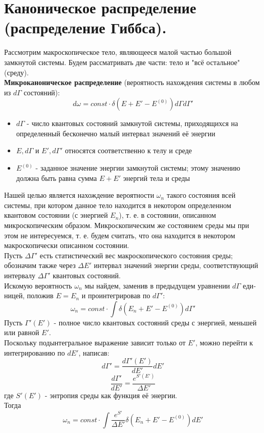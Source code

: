 \section {Каноническое распределение (распределение Гиббса).}
Рассмотрим макроскопическое тело, являющееся малой частью большой замкнутой системы. Будем рассматривать две части: тело и "всё остальное" (среду).\\
\textbf{Микроканоническое распределение} (вероятность нахождения системы в любом из $d\Gamma$ состояний):
$$
d\omega = const \cdot \delta (E + E' - E^{(0)})d\Gamma	d\Gamma'
$$
\begin{itemize}
	\item $d\Gamma$ - число квантовых состояний замкнутой системы, приходящихся на определенный бесконечно малый интервал значений её энергии
	\item $E, d\Gamma$ и $ E', d\Gamma'$ относятся соответственно к телу и среде
	\item $E^{(0)}$ - заданное значение энергии замкнутой системы; этому
	значению должна быть равна сумма $E + E'$ энергий тела и среды
\end{itemize}
Нашей целью является нахождение вероятности $\omega_n$ такого
состояния всей системы, при котором данное тело находится в
некотором определенном квантовом состоянии (с энергией $E_n$),
т. е. в состоянии, описанном микроскопическим образом. Ми­кроскопическим же состоянием среды мы при этом не инте­ресуемся, т. е. будем считать, что она находится в некотором макроскопически описанном состоянии.\\
Пусть $\Delta\Gamma'$ есть стати­стический вес макроскопического состояния среды; обозначим также через $\Delta E'$ интервал значений энергии среды, соответствующий интервалу $\Delta\Gamma'$ квантовых состояний.\\
Искомую вероятность $\omega_n$ мы найдем, заменив в предыдущем уравнении $d\Gamma$ еди­ницей, положив $E = E_n$ и проинтегрировав по $d\Gamma'$:
$$
\omega_n = const \cdot \int \delta(E_n + E' - E^{(0)})d\Gamma'
$$
Пусть $\Gamma'(E')$ - полное число квантовых состояний среды с энергией, меньшей или равной $E'$.\\
Поскольку подынтегральное выражение зависит только от $E'$, можно перейти к интегри­рованию по $dE'$, написав:
$$
d\Gamma' = \frac{d\Gamma'(E')}{dE'}dE'
$$
$$
\frac{d\Gamma'}{dE'} = \frac{e^{S'(E')}}{\Delta E'}
$$
где $S'(E')$ - энтропия среды как функция её энергии.\\
Тогда
$$
\omega_n = const \cdot \int \frac{e^{S'}}{\Delta E'}\delta(E_n + E' - E^{(0)})dE'
$$
